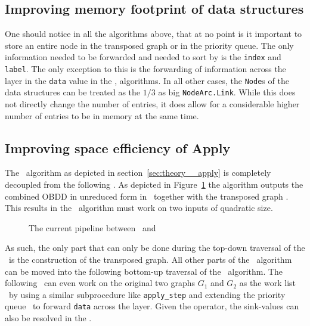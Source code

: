 
\subsection{Improving memory footprint of data structures}
One should notice in all the algorithms above, that at no point is it important
to store an entire node in the transposed graph or in the priority queue. The
only information needed to be forwarded and needed to sort by is the
\lstinline{index} and \lstinline{label}. The only exception to this is the
forwarding of information across the layer in the \lstinline{data} value in the
\Apply, \Equal algorithms. In all other cases, the \lstinline{Node}s of the data
structures can be treated as the $1/3$ as big \lstinline{NodeArc.Link}. While
this does not directly change the number of entries, it does allow for a
considerable higher number of entries to be in memory at the same time.

\subsection{Improving space efficiency of Apply}
The \Apply\ algorithm as depicted in section~\ref{sec:theory__apply} is
completely decoupled from the following \Reduce. As depicted in
Figure~\ref{fig:apply_reduce_simple_pipeline} the \Apply algorithm outputs the
combined OBDD in unreduced form in \ReduceLwork\ together with the transposed
graph \ReduceLdep. This results in the \Reduce\ algorithm must work on two
inputs of quadratic size.

\begin{figure}[ht!]
  \centering

  
  
  \caption{The current pipeline between \Apply\ and \Reduce}
  \label{fig:apply_reduce_simple_pipeline}
\end{figure}

As such, the only part that can only be done during the top-down traversal of
the \Apply\ is the construction of the transposed graph. All other parts of the
\Apply\ algorithm can be moved into the following bottom-up traversal of the
\Reduce\ algorithm. The following \Reduce\ can even work on the original two
graphs $G_1$ and $G_2$ as the work list \ReduceLwork\ by using a similar
subprocedure like \lstinline{apply_step} and extending the priority queue
\ReduceQdep\ to forward \lstinline{data} across the layer. Given the operator,
the sink-values can also be resolved in the \Reduce.

